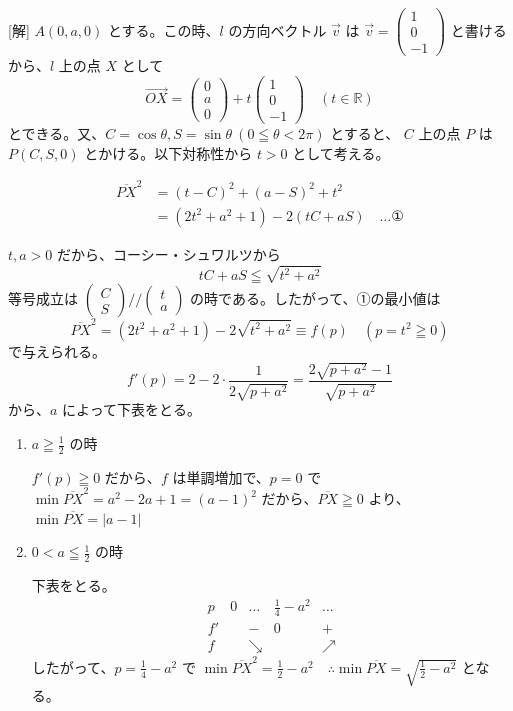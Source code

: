 \documentclass[../main.tex]{subfiles}
\begin{document}
[解] $A(0, a, 0)$ とする。この時、$l$ の方向ベクトル $\vec{v}$ は
$\vec{v} =
\begin{pmatrix} 1 \\ 0 \\ -1
\end{pmatrix}$ と書けるから、$l$ 上の点 $X$ として
\[
  \vec{OX} =
  \begin{pmatrix} 0 \\ a \\ 0
  \end{pmatrix} + t
  \begin{pmatrix} 1 \\ 0 \\ -1
  \end{pmatrix} \quad (t \in \mathbb{R})
\]
とできる。又、$C = \cos\theta, S = \sin\theta \ (0 \leqq \theta < 2\pi)$ とすると、
$C$ 上の点 $P$ は $P(C, S, 0)$ とかける。以下対称性から $t > 0$ として考える。

\begin{align*}
  \overline{PX}^2 &= (t - C)^2 + (a - S)^2 + t^2 \\
  &= (2t^2 + a^2 + 1) - 2(t C + a S) \quad \dots \text{①}
\end{align*}

$t, a > 0$ だから、コーシー・シュワルツから
\[
  t C + a S \leqq \sqrt{t^2 + a^2}
\]
等号成立は $
\begin{pmatrix} C \\ S
\end{pmatrix} \mathbin{/\!\!/}
\begin{pmatrix} t \\ a
\end{pmatrix}$ の時である。したがって、①の最小値は
\[
  \overline{PX}^2 = (2t^2 + a^2 + 1) - 2\sqrt{t^2 + a^2} \equiv f(p) \quad (p = t^2 \geqq 0)
\]
で与えられる。
\[
  f'(p) = 2 - 2 \cdot \frac{1}{2\sqrt{p + a^2}} = \frac{2\sqrt{p + a^2} - 1}{\sqrt{p + a^2}}
\]
から、$a$ によって下表をとる。

\begin{enumerate}
  \item[$1^\circ$] $a \geqq \frac{1}{2}$ の時

    $f'(p) \geqq 0$ だから、$f$ は単調増加で、$p = 0$ で $\min \overline{PX}^2 = a^2 - 2a + 1 = (a - 1)^2$
    だから、$\overline{PX} \geqq 0$ より、$\min \overline{PX} = |a - 1|$

  \item[$2^\circ$] $0 < a \leqq \frac{1}{2}$ の時

    下表をとる。
    \[
      \begin{array}{c|c|c|c|c}
        p & 0 & \dots & \frac{1}{4} - a^2 & \dots \\ \hline
        f' & & - & 0 & + \\ \hline
        f & & \searrow & & \nearrow
      \end{array}
    \]
    したがって、$p = \frac{1}{4} - a^2$ で $\min \overline{PX}^2 = \frac{1}{2} - a^2 \quad \therefore \min \overline{PX} = \sqrt{\frac{1}{2} - a^2}$ となる。
\end{enumerate}
\end{document}
